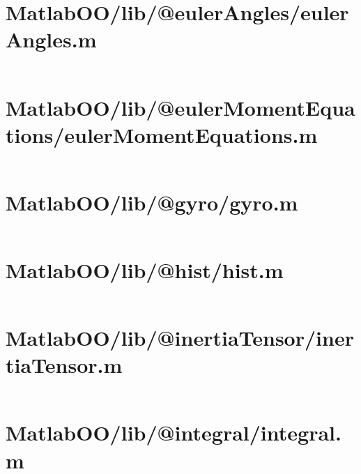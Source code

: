 \pagebreak
\section{MatlabOO/lib/@eulerAngles/eulerAngles.m}\label{code:MatlabOO/lib/@eulerAngles/eulerAngles.m}
\inputminted[linenos,fontsize=\scriptsize]{matlab}{/home/dcouture/git/mathyourlife/TSatPy/beta_versions/matlab_object_oriented/lib/@eulerAngles/eulerAngles.m}

\pagebreak
\section{MatlabOO/lib/@eulerMomentEquations/eulerMomentEquations.m}\label{code:MatlabOO/lib/@eulerMomentEquations/eulerMomentEquations.m}
\inputminted[linenos,fontsize=\scriptsize]{matlab}{/home/dcouture/git/mathyourlife/TSatPy/beta_versions/matlab_object_oriented/lib/@eulerMomentEquations/eulerMomentEquations.m}

\pagebreak
\section{MatlabOO/lib/@gyro/gyro.m}\label{code:MatlabOO/lib/@gyro/gyro.m}
\inputminted[linenos,fontsize=\scriptsize]{matlab}{/home/dcouture/git/mathyourlife/TSatPy/beta_versions/matlab_object_oriented/lib/@gyro/gyro.m}

\pagebreak
\section{MatlabOO/lib/@hist/hist.m}\label{code:MatlabOO/lib/@hist/hist.m}
\inputminted[linenos,fontsize=\scriptsize]{matlab}{/home/dcouture/git/mathyourlife/TSatPy/beta_versions/matlab_object_oriented/lib/@hist/hist.m}

\pagebreak
\section{MatlabOO/lib/@inertiaTensor/inertiaTensor.m}\label{code:MatlabOO/lib/@inertiaTensor/inertiaTensor.m}
\inputminted[linenos,fontsize=\scriptsize]{matlab}{/home/dcouture/git/mathyourlife/TSatPy/beta_versions/matlab_object_oriented/lib/@inertiaTensor/inertiaTensor.m}

\pagebreak
\section{MatlabOO/lib/@integral/integral.m}\label{code:MatlabOO/lib/@integral/integral.m}
\inputminted[linenos,fontsize=\scriptsize]{matlab}{/home/dcouture/git/mathyourlife/TSatPy/beta_versions/matlab_object_oriented/lib/@integral/integral.m}

